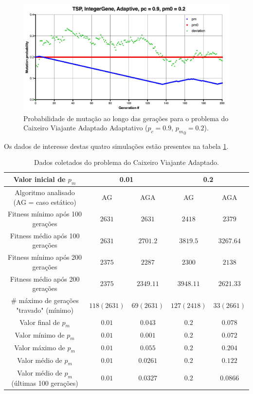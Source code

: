 \begin{figure}[ht!]
    \centering \includegraphics[width=1.0\textwidth]{tsp_02_adaptive_pm.jpg}
    \caption{Probabilidade de mutação ao longo das gerações para o problema do Caixeiro Viajante Adaptado Adaptativo ($p_c=0.9$, ${p_m}_0=0.2$).}
    \label{fig:tsp_02_adaptive_pm}
\end{figure}

Os dados de interesse destas quatro simulações estão presentes na tabela \ref{tab:tsp}.

\begin{table}
\caption{Dados coletados do problema do Caixeiro Viajante Adaptado.}
\label{tab:tsp}

\centering
\begin{tabular}[!hbt]{|c|cc|cc|}
	\hline
	Valor inicial de $p_m$						& \multicolumn{2}{c|}{0.01}		& \multicolumn{2}{c|}{0.2}		\\
	\hline
	Algoritmo analisado (AG = caso estático)	& AG			& AGA			& AG			& AGA			\\
	\hline
	Fitness mínimo após 100 gerações			& $2631$		& $2631$		& $2418$		& $2379$		\\
	Fitness médio após 100 gerações				& $2631$		& $2701.2$		& $3819.5$		& $3267.64$		\\
	Fitness mínimo após 200 gerações 			& $2375$		& $2287$		& $2300$		& $2138$		\\
	Fitness médio após 200 gerações 			& $2375$		& $2349.11$		& $3948.11$		& $2621.33$		\\
	\# máximo de gerações "travado" (mínimo)	& $118 (2631)$	& $69 (2631)$	& $127 (2418)$	& $33 (2661)$	\\
	Valor final de $p_m$						& $0.01$		& $0.043$		& $0.2$			& $0.078$		\\
	Valor mínimo de $p_m$						& $0.01$		& $0.001$		& $0.2$			& $0.072$		\\
	Valor máximo de $p_m$						& $0.01$		& $0.055$		& $0.2$			& $0.204$		\\
	Valor médio de $p_m$						& $0.01$		& $0.0261$		& $0.2$			& $0.122$		\\
	Valor médio de $p_m$ (últimas 100 gerações)	& $0.01$		& $0.0327$		& $0.2$			& $0.0866$		\\
	\hline
\end{tabular}
\end{table}

